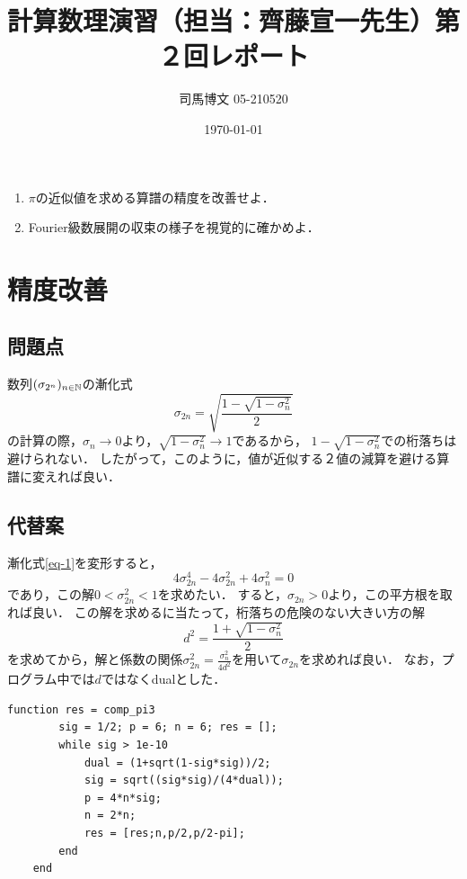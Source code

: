 \documentclass[uplatex, dvipdfmx]{jsarticle}
\title{計算数理演習（担当：齊藤宣一先生）第２回レポート}
\author{司馬博文 05-210520}
\date{\today}
\begin{document}
\maketitle

\begin{kadai*}\mbox{}
    \begin{enumerate}
        \item $\pi$の近似値を求める算譜の精度を改善せよ．
        \item Fourier級数展開の収束の様子を視覚的に確かめよ．
    \end{enumerate}
\end{kadai*}

\section{精度改善}

\subsection{問題点}

数列$(\sigma_{2^n})_{n\in\mathbb{N}}$の漸化式
\begin{equation}\label{eq-1}
    \sigma_{2n}=\sqrt{\frac{1-\sqrt{1-\sigma^2_n}}{2}}
\end{equation}
の計算の際，$\sigma_n\to 0$より，$\sqrt{1-\sigma^2_n}\to 1$であるから，
$1-\sqrt{1-\sigma^2_n}$での桁落ちは避けられない．
したがって，このように，値が近似する２値の減算を避ける算譜に変えれば良い．

\subsection{代替案}

漸化式\ref{eq-1}を変形すると，
\[4\sigma_{2n}^4-4\sigma_{2n}^2+4\sigma_{n}^2=0\]
であり，この解$0<\sigma_{2n}^2<1$を求めたい．
すると，$\sigma_{2n}>0$より，この平方根を取れば良い．
この解を求めるに当たって，桁落ちの危険のない大きい方の解
\[d^2=\frac{1+\sqrt{1-\sigma_{n}^2}}{2}\]
を求めてから，解と係数の関係$\sigma_{2n}^2=\frac{\sigma_{n}^2}{4d^2}$を用いて$\sigma_{2n}$を求めれば良い．
なお，プログラム中では$d$ではなくdualとした．
\vspace{1em}
\begin{lstlisting}[caption=代替案]
    function res = comp_pi3
        sig = 1/2; p = 6; n = 6; res = [];
        while sig > 1e-10
            dual = (1+sqrt(1-sig*sig))/2;
            sig = sqrt((sig*sig)/(4*dual));
            p = 4*n*sig;
            n = 2*n;
            res = [res;n,p/2,p/2-pi];
        end
    end
\end{lstlisting}
\end{document}
